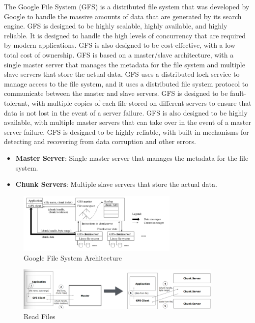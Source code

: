 \begin{exampleblock}
    The Google File System (GFS) is a distributed file system that was developed by Google to handle the massive amounts of data that are generated by its search engine. GFS is designed to be highly scalable, highly available, and highly reliable. It is designed to handle the high levels of concurrency that are required by modern applications. GFS is also designed to be cost-effective, with a low total cost of ownership. GFS is based on a master/slave architecture, with a single master server that manages the metadata for the file system and multiple slave servers that store the actual data. GFS uses a distributed lock service to manage access to the file system, and it uses a distributed file system protocol to communicate between the master and slave servers. GFS is designed to be fault-tolerant, with multiple copies of each file stored on different servers to ensure that data is not lost in the event of a server failure. GFS is also designed to be highly available, with multiple master servers that can take over in the event of a master server failure. GFS is designed to be highly reliable, with built-in mechanisms for detecting and recovering from data corruption and other errors.

    \begin{itemize}
        \item \textbf{Master Server}: Single master server that manages the metadata for the file system.
        \item \textbf{Chunk Servers}: Multiple slave servers that store the actual data.
    \end{itemize}
    
    \begin{figure}[H]
        \centering
        \includegraphics[width=0.7\textwidth]{assets/fig43.png}
        \caption{Google File System Architecture}
    \end{figure}

    \begin{figure}[H]
        \centering
        \includegraphics[width=0.9\textwidth]{assets/fig44.png}
        \caption{Read Files}
    \end{figure}
\end{exampleblock}

